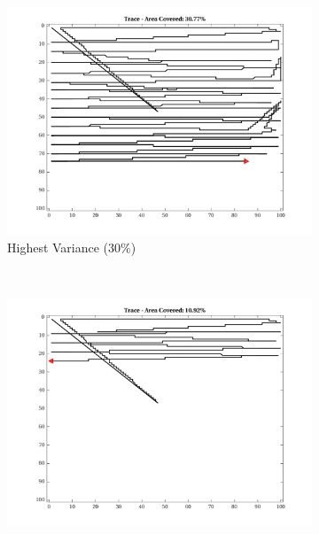 \begin{figure}[htb!]
\begin{subfigure}[t]{0.32\textwidth}
    \end{subfigure}%
    \begin{subfigure}[t]{0.32\textwidth}
        \centering
        \includegraphics[width=\linewidth]{figures/hbresults/path_nhv_30p_100x100_sf_1_seed_2.png}
        \ssp
        \captionsetup{skip=0.20\baselineskip,size=footnotesize}
        \caption{Highest Variance ($30\%$)}
    \end{subfigure}%
    \\
    \begin{subfigure}[t]{0.32\textwidth}
        \centering
        \includegraphics[width=\linewidth]{figures/hbresults/path_nnhv_10p_100x100_sf_1_seed_2.png}
        \ssp
        \captionsetup{skip=0.20\baselineskip,size=footnotesize}

\end{subfigure}
\end{figure}
